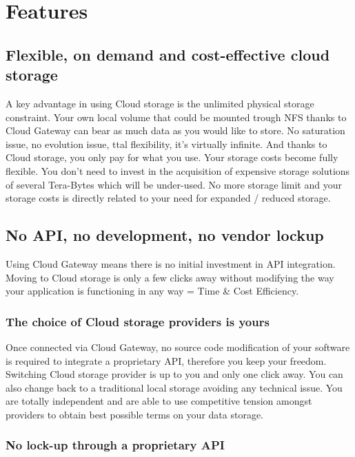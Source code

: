 \documentclass[11pt,fleqn,openany]{book} %
\begin{document}
\section{Features}
\label{sec:features}

\subsection{Flexible, on demand and cost-effective cloud storage}

A key advantage in using Cloud storage is the unlimited physical storage constraint. Your own local volume that could be mounted trough NFS thanks to Cloud Gateway can bear as much data as you would like to store. No saturation issue, no evolution issue, ttal flexibility, it's virtually infinite. And thanks to Cloud storage, you only pay for what you use. Your storage costs become fully flexible. You don’t need to invest in the acquisition of expensive storage solutions of several Tera-Bytes which will be under-used. No more storage limit and your storage costs is directly related to your need for expanded / reduced storage.

\subsection{No API, no development, no vendor lockup}

Using Cloud Gateway means there is no initial investment in API integration. Moving to Cloud storage is only a few clicks away without modifying the way your application is functioning in any way = Time \& Cost Efficiency.

\subsubsection*{The choice of Cloud storage providers is yours}

Once connected via Cloud Gateway, no source code modification of your software is required to integrate a proprietary API, therefore you keep your freedom. Switching Cloud storage provider is up to you and only one click away. You can also change back to a traditional local storage avoiding any technical issue. You are totally independent and are able to use competitive tension amongst providers to obtain best possible terms on your data storage.

\subsubsection*{No lock-up through a proprietary API}
\end{document}
